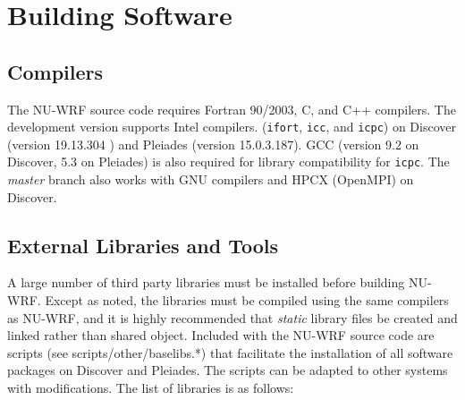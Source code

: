 \section{Building Software}
\label{sec:Building}

\subsection{Compilers}

The NU-WRF source code requires Fortran 90/2003, C, and C++ compilers. 
The development version supports Intel compilers.
(\texttt{ifort}, \texttt{icc}, and \texttt{icpc}) on Discover (version 19.13.304 ) and Pleiades (version 15.0.3.187). GCC (version 9.2 on Discover, 5.3 on Pleiades) is also required for library compatibility for \texttt{icpc}. The \emph{master} branch also works with GNU compilers and HPCX (OpenMPI) on Discover. 

\subsection{External Libraries and Tools}
\label{subsec:Libraries}

A large number of third party libraries must be installed before building 
NU-WRF. Except as noted, the libraries must be compiled using the same 
compilers as NU-WRF, and it is highly recommended that \emph{static} 
library files be created and linked rather than shared object. Included with 
the NU-WRF source code are scripts (see scripts/other/baselibs.*) that facilitate the installation of
all software packages on Discover and Pleiades. The scripts can be adapted to other systems with
 modifications. The list of libraries is as follows:

